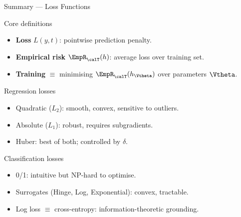 \begin{frame}{Summary — Loss Functions}
  \begin{block}{Core definitions}
    \begin{itemize}
      \item \textbf{Loss} $L(y,t)$: pointwise prediction penalty.
      \item \textbf{Empirical risk} $\EmpR_\calT(h)$: average loss over training set.
      \item \textbf{Training} $\equiv$ minimising $\EmpR_\calT(h_{\Vtheta})$ over parameters $\Vtheta$.
    \end{itemize}
  \end{block}

  \vspace{.4em}
  \begin{block}{Regression losses}
    \begin{itemize}
      \item Quadratic ($L_2$): smooth, convex, sensitive to outliers.
      \item Absolute ($L_1$): robust, requires subgradients.
      \item Huber: best of both; controlled by $\delta$.
    \end{itemize}
  \end{block}

  \vspace{.4em}
  \begin{block}{Classification losses}
    \begin{itemize}
      \item 0/1: intuitive but NP-hard to optimise.
      \item Surrogates (Hinge, Log, Exponential): convex, tractable.
      \item Log loss $\equiv$ cross-entropy: information-theoretic grounding.
    \end{itemize}
  \end{block}
\end{frame}

